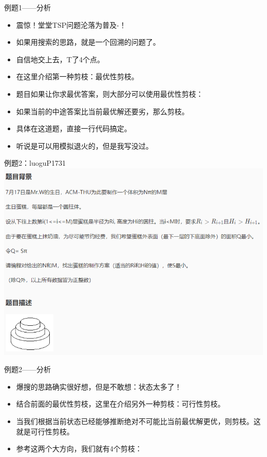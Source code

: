 \documentclass{beamer}[UTF-8]
\begin{document}
\begin{frame}{例题1——分析}
  \pause
\begin{itemize}
  \item 震惊！堂堂TSP问题沦落为普及-！ \pause
  \item 如果用搜索的思路，就是一个回溯的问题了。 \pause
  \item 自信地交上去，T了4个点。 \pause
  \item 在这里介绍第一种剪枝：最优性剪枝。 \pause
  \item 题目如果让你求最优答案，则大部分可以使用最优性剪枝： \pause
  \item 如果当前的中途答案比当前最优解还要劣，那么剪枝。 \pause
  \item 具体在这道题，直接一行代码搞定。 \pause
  \item 听说是可以用模拟退火的，但是我写没过。
\end{itemize}
\end{frame}


\begin{frame}{例题2：luoguP1731}
\includegraphics[width=\textwidth, height=\textheight]{luoguP1731.png}
\end{frame}

\begin{frame}{例题2——分析}
  \pause
\begin{itemize}
  \item 爆搜的思路确实很好想，但是不敢想：状态太多了！ \pause
  \item 结合前面的最优性剪枝，这里在介绍另外一种剪枝：可行性剪枝。 \pause
  \item 当我们根据当前状态已经能够推断绝对不可能比当前最优解更优，则剪枝。这就是可行性剪枝。 \pause
  \item 参考这两个大方向，我们就有4个剪枝：
\end{itemize}
\end{frame}
\end{document}
